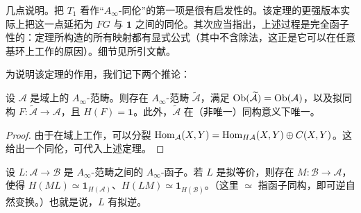 
几点说明。把 $T_1$ 看作“$A_\infty$-同伦”的第一项是很有启发性的。该定理的更强版本实际上把这一点延拓为 $FG$ 与 $\mathbf{1}$ 之间的同伦。其次应当指出，上述过程是完全函子性的：定理所构造的所有映射都有显式公式（其中不含除法，这正是它可以在任意基环上工作的原因）。细节见所引文献。

为说明该定理的作用，我们记下两个推论：

\begin{corollary*}
设 $\mathcal{A}$ 是域上的 $A_\infty$-范畴。则存在 $A_\infty$-范畴 $\widetilde{\mathcal{A}}$，满足 $\operatorname{Ob}(\widetilde{\mathcal{A}})=\operatorname{Ob}(\mathcal{A})$，以及拟同构 $F\colon\widetilde{\mathcal{A}}\to\mathcal{A}$，且 $H(F)=\mathbf{1}$。此外，$\widetilde{\mathcal{A}}$ 在（非唯一）同构意义下唯一。
\end{corollary*}

\begin{proof}
由于在域上工作，可以分裂 $\operatorname{Hom}_{\mathcal{A}}(X,Y)=\operatorname{Hom}_{H\mathcal{A}}(X,Y)\oplus C(X,Y)$。这给出一个同伦，可代入上述定理。
\end{proof}


\begin{corollary*}
设 $L\colon\mathcal{A}\to\mathcal{B}$ 是 $A_\infty$-范畴之间的 $A_\infty$-函子。若 $L$ 是拟等价，则存在 $M\colon\mathcal{B}\to\mathcal{A}$，使得 $H(ML)\simeq\mathbf{1}_{H(\mathcal{A})}$、$H(LM)\simeq\mathbf{1}_{H(\mathcal{B})}$。（这里 $\simeq$ 指函子同构，即可逆自然变换。）也就是说，$L$ 有拟逆。
\end{corollary*}

